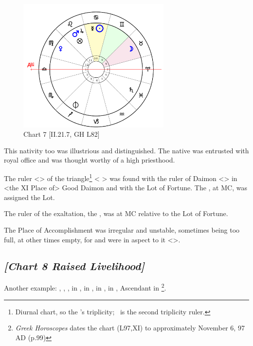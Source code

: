 \clearpage
\begin{figure}
\centering

\includegraphics[width=0.68\textwidth]{charts/2_21_7}
\caption{Chart 7 [II.21.7, GH L82]}
\label{fig:chart07}
\end{figure}

This nativity too was illustrious and distinguished. The native was entrusted with royal office and was thought worthy of a high priesthood. 

The ruler <\Mars> of the triangle\footnote{Diurnal chart, so the \Sun's triplicity; \Mars\, is the second triplicity ruler.} <\Cancer\,\Scorpio\,\Pisces> was found with the ruler of Daimon <\Jupiter> in <the XI Place of> Good Daimon and with the Lot of Fortune. The \Sun, at MC, was assigned the Lot. 

The ruler of the exaltation, the \Moon, was at MC relative to the Lot of Fortune. 

The Place of Accomplishment was irregular and unstable, sometimes being too full, at other times empty, for \Saturn\xspace and \Venus\xspace were in aspect to it <\Square>.

\newpage

\subsection*{\textit{[Chart 8 Raised Livelihood]}}

Another example: \Sun, \Jupiter, \Mars, \Venus in \Scorpio, \Saturn\xspace in \Libra, \Moon\xspace in \Aries, \Mercury\xspace in \Sagittarius, Ascendant in \Leo
\footnote{\textit{Greek Horoscopes} dates the chart (L97,XI) to approximately November 6, 97 AD (p.99)}.

